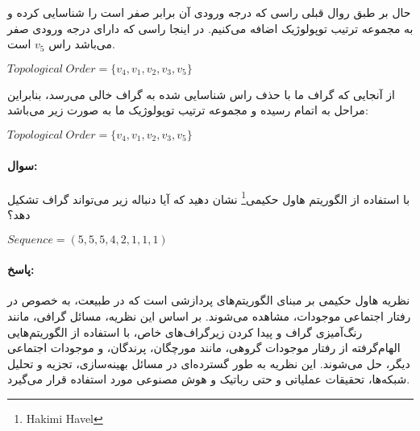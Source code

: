 \documentclass[a4paper,10pt]{article}
\begin{document}
    حال بر طبق روال قبلی راسی که درجه ورودی آن برابر صفر است را شناسایی کرده و به مجموعه ترتیب توپولوژیک اضافه می‌کنیم. در اینجا راسی که دارای درجه ورودی صفر می‌باشد راس $v_5$ است.

    \begin{center}
        
        $Topological \hspace{3pt} Order = \{v_4, v_1, v_2, v_3, v_5\}$

    \end{center}

    از آنجایی که گراف ما با حذف راس شناسایی شده به گراف خالی می‌رسد، بنابراین مراحل به اتمام رسیده و مجموعه ترتیب توپولوژیک ما به صورت زیر می‌باشد:

    \begin{center}
        
        $Topological \hspace{3pt} Order = \{v_4, v_1, v_2, v_3, v_5\}$

    \end{center}

    \noindent\hrulefill

    \paragraph{سوال:} با استفاده از الگوریتم هاول حکیمی\footnote{\hspace{2pt}Hakimi Havel} نشان دهید که آیا دنباله‌ زیر می‌تواند گراف تشکیل دهد؟

    \begin{center}
        
        $Sequence = (5,5,5,4,2,1,1,1)$

    \end{center}

    \paragraph{پاسخ:} نظریه هاول حکیمی بر مبنای الگوریتم‌های پردازشی است که در طبیعت، به خصوص در رفتار اجتماعی موجودات، مشاهده می‌شوند. بر اساس این نظریه، مسائل گرافی، مانند رنگ‌آمیزی گراف و پیدا کردن زیرگراف‌های خاص، با استفاده از الگوریتم‌هایی الهام‌گرفته از رفتار موجودات گروهی، مانند مورچگان، پرندگان، و موجودات اجتماعی دیگر، حل می‌شوند. این نظریه به طور گسترده‌ای در مسائل بهینه‌سازی، تجزیه و تحلیل شبکه‌ها، تحقیقات عملیاتی و حتی رباتیک و هوش مصنوعی مورد استفاده قرار می‌گیرد.
\end{document}
